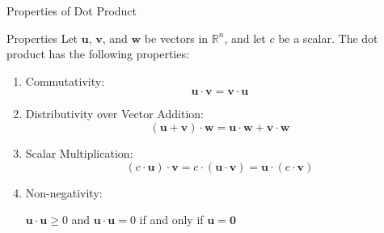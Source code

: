 \documentclass{beamer}
\begin{document}
\begin{frame}{Properties of Dot Product}
  \begin{block}{Properties}
    Let \( \mathbf{u} \), \( \mathbf{v} \), and \( \mathbf{w} \) be vectors in \( \mathbb{R}^n \), and let \( c \) be a scalar. The dot product has the following properties:

    \begin{enumerate}
      \item {Commutativity:} $$ \mathbf{u} \cdot \mathbf{v} = \mathbf{v} \cdot \mathbf{u}$$
      \item {Distributivity over Vector Addition:} $$ (\mathbf{u} + \mathbf{v}) \cdot \mathbf{w} = \mathbf{u} \cdot \mathbf{w} + \mathbf{v} \cdot \mathbf{w} $$
      \item {Scalar Multiplication:} $$(c \cdot \mathbf{u}) \cdot \mathbf{v} = c \cdot (\mathbf{u} \cdot \mathbf{v}) = \mathbf{u} \cdot (c \cdot \mathbf{v})$$
      \item {Non-negativity:} 
      
      \centerline{$\mathbf{u} \cdot \mathbf{u} \geq 0 $ and \( \mathbf{u} \cdot \mathbf{u} = 0 \) if and only if \( \mathbf{u} = \mathbf{0} \)}
    \end{enumerate}
  \end{block}
\end{frame}
\end{document}
